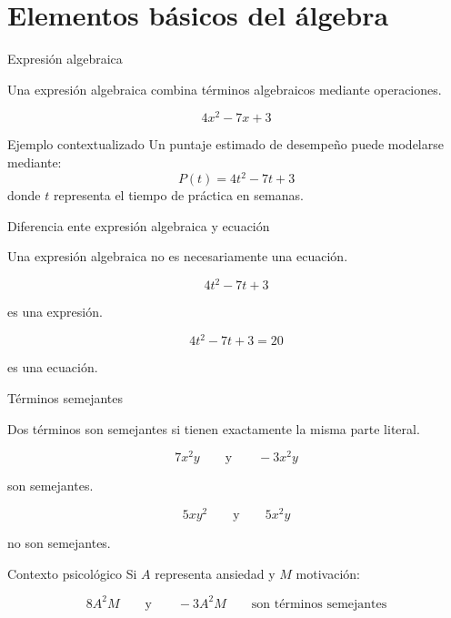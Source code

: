 \documentclass[handout,aspectratio=169]{beamer}
\begin{document}
	\section{Elementos básicos del álgebra}
	\begin{frame}{Expresión algebraica}
		\begin{idea}
			Una expresión algebraica combina términos algebraicos mediante operaciones.
		\end{idea}
		\[
		4x^2-7x+3
		\]
		
		\pause
		
		\begin{exampleblock}{Ejemplo contextualizado}
			Un puntaje estimado de desempeño puede modelarse mediante:
					\[
			P(t)=4t^2-7t+3
			\]
			donde \(t\) representa el tiempo de práctica en semanas.
		\end{exampleblock}
	\end{frame}	
	
	\begin{frame}{Diferencia ente expresión algebraica y ecuación}
		
		\begin{alerta}
			Una expresión algebraica no es necesariamente una ecuación.
			
			\[
			4t^2-7t+3
			\]
			
			es una expresión.
			
			\[
			4t^2-7t+3=20
			\]
			
			es una ecuación.
		\end{alerta}
	\end{frame}
	
	
	\begin{frame}{Términos semejantes}
		\begin{idea}
			Dos términos son semejantes si tienen exactamente la misma parte literal.
		\end{idea}
		
		\[
		7x^2y
		\qquad\text{y}\qquad
		-3x^2y
		\]
		
		son semejantes.
		
		\pause
		
		\[
		5xy^2
		\qquad\text{y}\qquad
		5x^2y
		\]
		
		no son semejantes.
		
		\pause
		
		\begin{exampleblock}{Contexto psicológico}
			Si \(A\) representa ansiedad y \(M\) motivación:
			
			\[
			8A^2M
			\qquad\text{y}\qquad
			-3A^2M \qquad 
			 \text{son términos semejantes}
			 \]
		\end{exampleblock}
	\end{frame}
	
\end{document}
